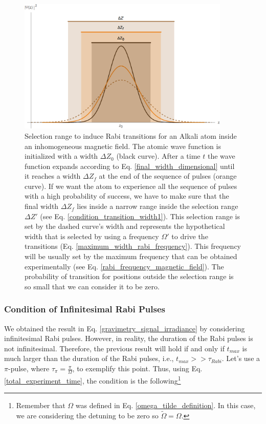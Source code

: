 \documentclass{article}
\begin{document}
\begin{figure}
    \centering
    \includegraphics[width=0.9\textwidth]{working_area.png}
     \caption{Selection range to induce Rabi transitions for an Alkali atom inside an inhomogeneous magnetic field. The atomic wave function is initialized with a width $\Delta Z_{0}$ (black curve). After a time $t$ the wave function expands according to Eq. \ref{final_width_dimensional} until it reaches a width $\Delta Z_{f}$ at the end of the sequence of pulses (orange curve). If we want the atom to experience all the sequence of pulses with a high probability of success, we have to make sure that the final width $\Delta Z_{f}$ lies inside a narrow range inside the selection range $\Delta Z'$ (see Eq. \ref{condition_transition_width1}). This selection range is set by the dashed curve's width and represents the hypothetical width that is selected by using a frequency $\Omega'$ to drive the transitions (Eq. \ref{maximum_width_rabi_frequency}). This frequency will be usually set by the maximum frequency that can be obtained experimentally (see Eq. \ref{rabi_frequency_magnetic_field}). The probability of transition for positions outside the selection range is so small that we can consider it to be zero.}
     \label{selection_range_figure}
\end{figure}

\subsubsection{Condition of Infinitesimal Rabi Pulses}
We obtained the result in Eq. \ref{gravimetry_signal_irradiance} by considering infinitesimal Rabi pulses. However, in reality, the duration of the Rabi pulses is not infinitesimal. Therefore, the previous result will hold if and only if $t_{max}$ is much larger than the duration of the Rabi pulses, i.e., $t_{max} >> \tau_{Rabi}$. Let's use a $\pi$-pulse, where $\tau_{\pi} = \frac{\pi}{\Omega}$, to exemplify this point. Thus, using Eq. \ref{total_experiment_time}, the condition is the following\footnote{Remember that $\Omega$ was defined in Eq. \ref{omega_tilde_definition}. In this case, we are considering the detuning to be zero so $\tilde{\Omega} = \Omega$.}
\end{document}
